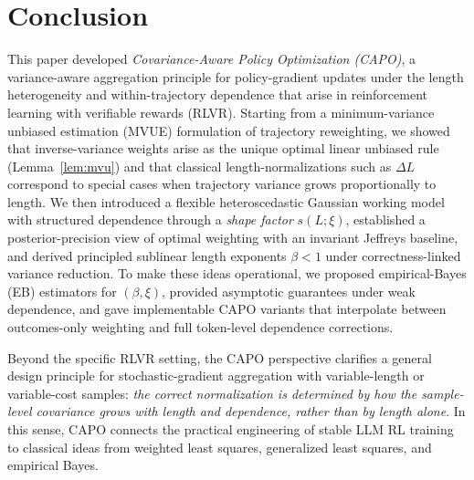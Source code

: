 \section{Conclusion}\label{secConc}

This paper developed \emph{Covariance-Aware Policy Optimization (CAPO)}, a variance-aware aggregation principle for policy-gradient updates under the length heterogeneity and within-trajectory dependence that arise in reinforcement learning with verifiable rewards (RLVR).
Starting from a minimum-variance unbiased estimation (MVUE) formulation of trajectory reweighting, we showed that inverse-variance weights arise as the unique optimal linear unbiased rule (Lemma~\ref{lem:mvu}) and that classical length-normalizations such as $\Delta L$ correspond to special cases when trajectory variance grows proportionally to length.
We then introduced a flexible heteroscedastic Gaussian working model with structured dependence through a \emph{shape factor} $s(L;\xi)$, established a posterior-precision view of optimal weighting with an invariant Jeffreys baseline, and derived principled sublinear length exponents $\beta<1$ under correctness-linked variance reduction.
To make these ideas operational, we proposed empirical-Bayes (EB) estimators for $(\beta,\xi)$, provided asymptotic guarantees under weak dependence, and gave implementable CAPO variants that interpolate between outcomes-only weighting and full token-level dependence corrections.

Beyond the specific RLVR setting, the CAPO perspective clarifies a general design principle for stochastic-gradient aggregation with variable-length or variable-cost samples:
\emph{the correct normalization is determined by how the sample-level covariance grows with length and dependence, rather than by length alone}.
In this sense, CAPO connects the practical engineering of stable LLM RL training to classical ideas from weighted least squares, generalized least squares, and empirical Bayes.

